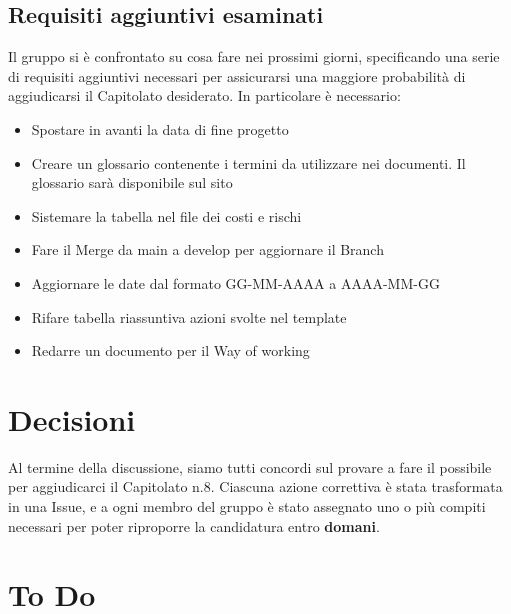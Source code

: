 \documentclass[a4paper,12pt]{article}
\begin{document}
\subsection{Requisiti aggiuntivi esaminati}
Il gruppo si è confrontato su cosa fare nei prossimi giorni, specificando una serie di requisiti aggiuntivi necessari per assicurarsi una maggiore probabilità di aggiudicarsi il Capitolato desiderato. In particolare è necessario:
\begin{itemize}
\item{Spostare in avanti la data di fine progetto}
\item{Creare un glossario contenente i termini da utilizzare nei documenti. Il glossario sarà disponibile sul sito}
\item{Sistemare la tabella nel file dei costi e rischi}
\item{Fare il Merge da main a develop per aggiornare il Branch}
\item{Aggiornare le date dal formato GG-MM-AAAA a AAAA-MM-GG}
\item{Rifare tabella riassuntiva azioni svolte nel template}
\item{Redarre un documento per il Way of working}
\end{itemize}
\section{Decisioni}
Al termine della discussione, siamo tutti concordi sul provare a fare il possibile per aggiudicarci il Capitolato n.8. Ciascuna azione correttiva è stata trasformata in una Issue, e a ogni membro del gruppo è stato assegnato uno o più compiti necessari per poter riproporre la candidatura entro \textbf{domani}.  

\section{To Do}
\end{document}
